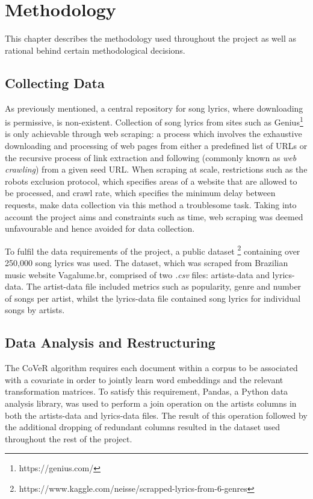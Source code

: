 \chapter{Methodology}
This chapter describes the methodology used throughout the project as well as rational behind certain methodological decisions. 
\label{chap:data_methodology}
\section{Collecting Data}
As previously mentioned, a central repository for song lyrics, where downloading is permissive, is non-existent. Collection of song lyrics from sites such as Genius\footnote{https://genius.com/} is only achievable through web scraping: a process which involves the exhaustive downloading and processing of web pages from either a predefined list of URLs or the recursive process of link extraction and following (commonly known as \textit{web crawling}) from a given seed URL. When scraping at scale, restrictions such as the robots exclusion protocol, which specifies areas of a website that are allowed to be processed, and crawl rate, which specifies the minimum delay between requests, make data collection via this method a troublesome task. Taking into account the project aims and constraints such as time, web scraping was deemed unfavourable and hence avoided for data collection.

\noindent
\newline
To fulfil the data requirements of the project, a public dataset \footnote{https://www.kaggle.com/neisse/scrapped-lyrics-from-6-genres} containing over 250,000 song lyrics was used. The dataset, which was scraped from Brazilian music website Vagalume.br, comprised of two \textit{.csv} files: artists-data and lyrics-data. The artist-data file included metrics such as popularity, genre and number of songs per artist, whilst the lyrics-data file contained song lyrics for individual songs by artists.

\section{Data Analysis and Restructuring}
The CoVeR algorithm requires each document within a corpus to be associated with a covariate in order to jointly learn word embeddings and the relevant transformation matrices. To satisfy this requirement, Pandas, a Python data analysis library, was used to perform a join operation on the artists columns in both the artists-data and lyrics-data files. The result of this operation followed by the additional dropping of redundant columns resulted in the dataset used throughout the rest of the project.


